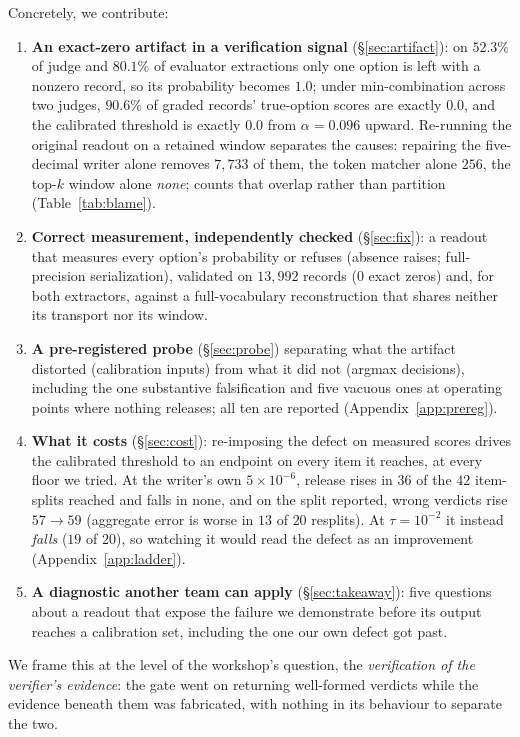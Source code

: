 \documentclass{article}
\begin{document}
Concretely, we contribute:
\begin{enumerate}
  \item \textbf{An exact-zero artifact in a verification signal}
    (\S\ref{sec:artifact}): on $52.3\%$ of judge and $80.1\%$ of evaluator
    extractions only one option is left with a
    nonzero record, so its probability becomes $1.0$; under min-combination
    across two judges, $90.6\%$ of graded records' true-option scores are exactly
    $0.0$, and the calibrated threshold is exactly $0.0$ from
    $\alpha = 0.096$ upward. Re-running the original readout on a retained window separates the
    causes: repairing the five-decimal writer alone removes $7{,}733$ of them,
    the token matcher alone $256$, the top-$k$ window alone \emph{none}; counts that overlap rather than partition (Table~\ref{tab:blame}).
  \item \textbf{Correct measurement, independently checked} (\S\ref{sec:fix}): a
    readout that measures every option's probability or refuses (absence raises; full-precision serialization),
    validated on $13{,}992$ records ($0$ exact
    zeros) and, for both extractors, against a full-vocabulary reconstruction
    that shares neither its transport nor its window.
  \item \textbf{A pre-registered probe} (\S\ref{sec:probe}) separating what the
    artifact distorted (calibration inputs) from what it did not (argmax
    decisions), including the one substantive falsification and five vacuous ones at
    operating points where nothing releases; all ten are reported
    (Appendix~\ref{app:prereg}).
  \item \textbf{What it costs} (\S\ref{sec:cost}): re-imposing the defect on
    measured scores drives the calibrated threshold to an endpoint on every item
    it reaches, at every floor we tried. At the writer's own $5\times10^{-6}$,
    release rises in $36$ of the $42$ item-splits reached and falls in none, and
    on the split reported, wrong verdicts rise $57 \to 59$ (aggregate error is
    worse in $13$ of $20$ resplits). At $\tau = 10^{-2}$ it instead
    \emph{falls} ($19$ of $20$), so watching it would read the defect as an
    improvement (Appendix~\ref{app:ladder}).
  \item \textbf{A diagnostic another team can apply} (\S\ref{sec:takeaway}):
    five questions about a readout that expose the failure we demonstrate before
    its output reaches a calibration set, including the one our own defect got
    past.
\end{enumerate}
We frame this at the level of the workshop's question, the \emph{verification of the verifier's evidence}: the
gate went on returning well-formed verdicts while the evidence beneath them was
fabricated, with nothing in its behaviour to separate the two.
\end{document}
